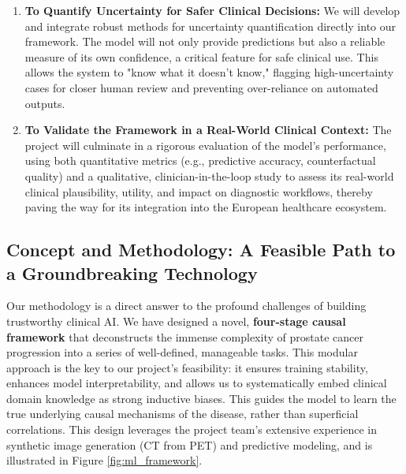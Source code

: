 \documentclass[11pt, a4paper]{article}
\begin{document}
\begin{enumerate}
    \item \textbf{To Quantify Uncertainty for Safer Clinical Decisions:} We will develop and integrate robust methods for uncertainty quantification directly into our framework. The model will not only provide predictions but also a reliable measure of its own confidence, a critical feature for safe clinical use. This allows the system to "know what it doesn't know," flagging high-uncertainty cases for closer human review and preventing over-reliance on automated outputs.
    \item \textbf{To Validate the Framework in a Real-World Clinical Context:} The project will culminate in a rigorous evaluation of the model's performance, using both quantitative metrics (e.g., predictive accuracy, counterfactual quality) and a qualitative, clinician-in-the-loop study to assess its real-world clinical plausibility, utility, and impact on diagnostic workflows, thereby paving the way for its integration into the European healthcare ecosystem.
\end{enumerate}

\subsection{Concept and Methodology: A Feasible Path to a Groundbreaking Technology}
Our methodology is a direct answer to the profound challenges of building trustworthy clinical AI. We have designed a novel, \textbf{four-stage causal framework} that deconstructs the immense complexity of prostate cancer progression into a series of well-defined, manageable tasks. This modular approach is the key to our project's feasibility: it ensures training stability, enhances model interpretability, and allows us to systematically embed clinical domain knowledge as strong inductive biases. This guides the model to learn the true underlying causal mechanisms of the disease, rather than superficial correlations. This design leverages the project team's extensive experience in synthetic image generation (CT from PET) and predictive modeling, and is illustrated in Figure \ref{fig:ml_framework}.
\end{document}
